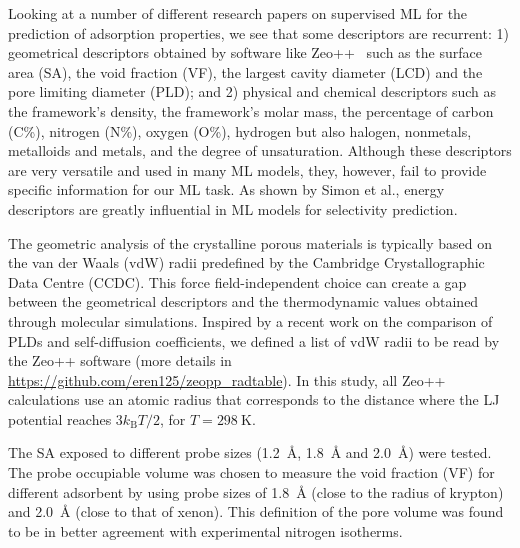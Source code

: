 \documentclass[main]{subfiles}
\begin{document}
Looking at a number of different research papers on supervised ML for the prediction of adsorption properties,\autocite{Fernandez_2013,Simon_2015,Fanourgakis_2020,Anderson_2020,Pardakhti_2020} we see that some descriptors are recurrent: 1) geometrical descriptors obtained by software like Zeo++~\autocite{zeopp_Willems2012} such as the surface area (SA), the void fraction (VF), the largest cavity diameter (LCD) and the pore limiting diameter (PLD); and 2) physical and chemical descriptors such as the framework's density, the framework's molar mass, the percentage of carbon (C\%), nitrogen (N\%), oxygen (O\%), hydrogen but also halogen, nonmetals, metalloids and metals, and the degree of unsaturation. Although these descriptors are very versatile and used in many ML models, they, however, fail to provide specific information for our ML task. As shown by Simon et al., energy descriptors are greatly influential in ML models for selectivity prediction.

The geometric analysis of the crystalline porous materials is typically based on the van der Waals (vdW) radii predefined by the Cambridge Crystallographic Data Centre (CCDC). This force field-independent choice can create a gap between the geometrical descriptors and the thermodynamic values obtained through molecular simulations. Inspired by a recent work on the comparison of PLDs and self-diffusion coefficients,\autocite{Hung_2021} we defined a list of vdW radii to be read by the Zeo++ software (more details in \url{https://github.com/eren125/zeopp_radtable}). In this study, all Zeo++ calculations use an atomic radius that corresponds to the distance where the LJ potential reaches $3 k_\text{B} T/2$, for $T = \SI{298}{\kelvin}$.

The SA exposed to different probe sizes (\SI{1.2}{\angstrom}, \SI{1.8}{\angstrom} and \SI{2.0}{\angstrom}) were tested. The probe occupiable volume was chosen to measure the void fraction (VF) for different adsorbent by using probe sizes of \SI{1.8}{\angstrom} (close to the radius of krypton) and \SI{2.0}{\angstrom} (close to that of xenon). This definition of the pore volume was found to be in better agreement with experimental nitrogen isotherms.\autocite{vol_Ongari2017}
\end{document}
